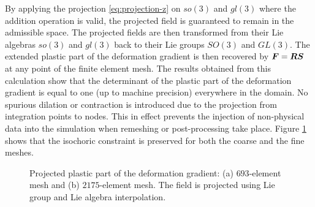 \documentclass[12pt]{article}
\newcommand{\mbs}[1]{\boldsymbol{#1}}
\def\bS{{\mbs{S}}} \def\bT{{\mbs{T}}} \def\bU{{\mbs{U}}}
\begin{document}
By applying the projection \eqref{eq:projection-z} on $so(3)$ and $gl(3)$ where
the addition operation is valid, the projected field is guaranteed to remain in
the admissible space. The projected fields are then transformed from their Lie
algebras $so(3)$ and $gl(3)$ back to their Lie groups $SO(3)$ and $GL(3)$. The
extended plastic part of the deformation gradient is then recovered by $\bF =
\bR \bS$ at any point of the finite element mesh. The results obtained from this
calculation show that the determinant of the plastic part of the deformation
gradient is equal to one (up to machine precision) everywhere in the domain. No
spurious dilation or contraction is introduced due to the projection from
integration points to nodes. This in effect prevents the injection of
non-physical data into the simulation when remeshing or post-processing take
place. Figure \ref{fig:billet-Lie} shows that the isochoric constraint is
preserved for both the coarse and the fine meshes.

\begin{figure}[htbp]
  \begin{center}
    \unitlength=1.0mm
    \caption{Projected plastic part of the deformation gradient: (a)
      $693$-element mesh and (b) $2175$-element mesh. The field is projected
      using Lie group and Lie algebra interpolation.}
    \label{fig:billet-Lie}
  \end{center}
\end{figure}
\end{document}
